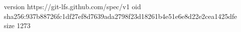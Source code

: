 version https://git-lfs.github.com/spec/v1
oid sha256:937b88726fc1df27ef8d7639ada2798f23d18261b4e51e6e8d22e2cea1425dfe
size 1273
